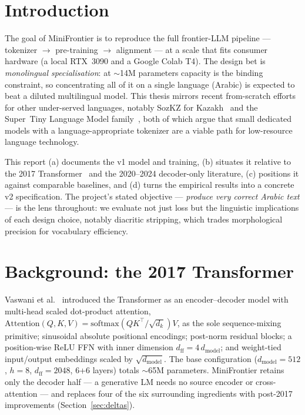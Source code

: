 \documentclass[10pt,twocolumn]{article}
\begin{document}
\section{Introduction}
The goal of MiniFrontier is to reproduce the full frontier-LLM pipeline ---
tokenizer $\rightarrow$ pre-training $\rightarrow$ alignment --- at a scale that
fits consumer hardware (a local RTX~3090 and a Google Colab T4). The design bet
is \emph{monolingual specialisation}: at $\sim$14M parameters capacity is the
binding constraint, so concentrating all of it on a single language (Arabic) is
expected to beat a diluted multilingual model. This thesis mirrors recent
from-scratch efforts for other under-served languages, notably SozKZ for
Kazakh~\cite{sozkz} and the Super~Tiny Language Model family~\cite{stlm}, both of
which argue that small dedicated models with a language-appropriate tokenizer are
a viable path for low-resource language technology.

This report (a) documents the v1 model and training, (b) situates it relative to
the 2017 Transformer~\cite{vaswani2017} and the 2020--2024 decoder-only
literature, (c) positions it against comparable baselines, and (d) turns the
empirical results into a concrete v2 specification. The project's stated
objective --- \emph{produce very correct Arabic text} --- is the lens
throughout: we evaluate not just loss but the linguistic implications of each
design choice, notably diacritic stripping, which trades morphological precision
for vocabulary efficiency.

\section{Background: the 2017 Transformer}
Vaswani et al.~\cite{vaswani2017} introduced the Transformer as an
encoder--decoder model with multi-head scaled dot-product attention,
$\mathrm{Attention}(Q,K,V)=\mathrm{softmax}\!\left(QK^{\top}/\sqrt{d_k}\right)V$,
as the sole sequence-mixing primitive; sinusoidal absolute positional encodings;
post-norm residual blocks; a position-wise ReLU FFN with inner dimension
$d_{\text{ff}}{=}4\,d_{\text{model}}$; and weight-tied input/output embeddings
scaled by $\sqrt{d_{\text{model}}}$. The base configuration
($d_{\text{model}}{=}512$, $h{=}8$, $d_{\text{ff}}{=}2048$, 6+6 layers) totals
$\sim$65M parameters. MiniFrontier retains only the decoder half --- a
generative LM needs no source encoder or cross-attention --- and replaces four
of the six surrounding ingredients with post-2017 improvements
(Section~\ref{sec:deltas}).
\end{document}
